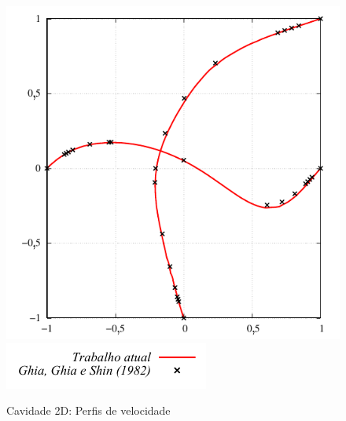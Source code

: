 \begin{figure}[!!htbp]
	\caption{Cavidade 2D: Perfis de velocidade} 
	\centering
	{\includegraphics[scale=0.8,trim=0cm 0cm 0cm 0cm, clip=true]{Imagens/Cap5/cav2d_perfil_vel_Re100.pdf}}\\
	{\includegraphics[scale=1.0,trim=0cm 0cm 0cm 0cm, clip=true]{Imagens/Cap5/cav2d_legenda.pdf}}
	\label{fig:cav2d_perfil_vel_Re100}
\end{figure}